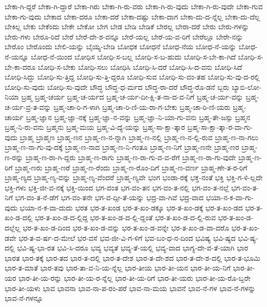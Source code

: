 {ಬೇಕಾ-ಗಿ-ದ್ದರೆ
ಬೇಕಾ-ಗಿ-ದ್ದಾರೆ
ಬೇಕಾ-ಗಿರು
ಬೇಕಾ-ಗಿ-ರು-ವರು
ಬೇಕಾ-ಗಿ-ರು-ವುದು
ಬೇಕಾ-ಗಿ-ರು-ವುದೇ
ಬೇಕಾ-ಗುವ
ಬೇಕಾ-ಗು-ವುದು
ಬೇಕಾದ
ಬೇಕಾ-ದರೂ
ಬೇಕಾ-ದರೆ
ಬೇಕಾ-ದಷ್ಟು
ಬೇಕಾ-ದಾಗ
ಬೇಕಾ-ದು-ದ-ನ್ನೆಲ್ಲ
ಬೇಕಾ-ದು-ದೆಲ್ಲ
ಬೇಕಿಲ್ಲ
ಬೇಕು
ಬೇಕೆಂದು
ಬೇಕೇ
ಬೇಕೋ
ಬೇಗ
ಬೇಡ
ಬೇಡಿ
ಬೇಡಿಕೆ
ಬೇರಲ್ಲ
ಬೇರಾ-ದರೆ
ಬೇರು
ಬೇರು-ಗಳನ್ನು
ಬೇರು-ಗಳು
ಬೇರೂ-ರಿದೆ
ಬೇರೆ
ಬೇರೆ-ದೇ-ಶ-ವನ್ನೂ
ಬೇರೆ-ಯಲ್ಲ
ಬೇರೆ-ಯ-ವ-ರಿಗೆ
ಬೇರೆಲ್ಲೂ
ಬೇರೇ-ನನ್ನು
ಬೇರೊಂ
ಬೇರೊಂದು
ಬೇಲಿ-ಯನ್ನು
ಬೈಯ್ಯ-ಬೇಡಿ
ಬೋಧಕ
ಬೋಧನೆ
ಬೋಧ-ನೆಯ
ಬೋಧ-ನೆ-ಯನ್ನು
ಬೋಧ-ನೆ-ಯನ್ನೂ
ಬೋಧ-ನೆ-ಯಿಂದ
ಬೋಧಿಸ
ಬೋಧಿ-ಸ-ಬಲ್ಲ
ಬೋಧಿ-ಸ-ಬ-ಹುದು
ಬೋಧಿ-ಸ-ಬೇ-ಕಾ-ಗಿದೆ
ಬೋಧಿ-ಸ-ಬೇ-ಕಾ-ದರೂ
ಬೋಧಿ-ಸ-ಬೇಕು
ಬೋಧಿ-ಸಲು
ಬೋಧಿಸಿ
ಬೋಧಿ-ಸಿ-ದರೆ
ಬೋಧಿ-ಸಿ-ದ-ವನು
ಬೋಧಿ-ಸಿದೆ
ಬೋಧಿ-ಸಿದ್ದು
ಬೋಧಿ-ಸು-ತ್ತಿದ್ದ
ಬೋಧಿ-ಸು-ತ್ತಿ-ದ್ದರೂ
ಬೋಧಿ-ಸುವ
ಬೋಧಿ-ಸು-ವಂ-ತಹ
ಬೋಧಿ-ಸು-ವು-ದ-ರಲ್ಲಿ
ಬೋಧಿ-ಸು-ವುದು
ಬೋಧಿ-ಸು-ವುದೇ
ಬೌದ್ಧ
ಬೌದ್ಧ-ಧ-ರ್ಮದ
ಬೌದ್ಧ-ರಾ-ದರೆ
ಬೌದ್ಧ-ರೊ-ಡನೆ
ಬ್ಬರು
ಬ್ಯಾಬಿ-ಲೋ-ನಿಯಾ
ಬ್ರಹ್ಮ
ಬ್ರಹ್ಮ-ಚರ್ಯ
ಬ್ರಹ್ಮ-ಚ-ರ್ಯದ
ಬ್ರಹ್ಮ-ಚ-ರ್ಯ-ದೀ-ಕ್ಷಿ-ತ-ನಾ-ದ-ವ-ನಿಗೆ
ಬ್ರಹ್ಮ-ಚ-ರ್ಯ-ವನ್ನು
ಬ್ರಹ್ಮ-ಚ-ರ್ಯ-ವ್ರ-ತ-ವನ್ನು
ಬ್ರಹ್ಮ-ಚಾ-ರಿ-ಗ-ಳಾಗಿ
ಬ್ರಹ್ಮ-ಚಾ-ರಿ-ಣಿ-ಯ-ರಾ-ಗ-ಬೇಕು
ಬ್ರಹ್ಮ-ಚಾ-ರಿ-ಣಿ-ಯರು
ಬ್ರಹ್ಮ-ಚಾರ್ಯ
ಬ್ರಹ್ಮ-ಜ್ಞಾನ
ಬ್ರಹ್ಮ-ಜ್ಞಾ-ನಕ್ಕೆ
ಬ್ರಹ್ಮ-ಜ್ಞಾ-ನ-ವನ್ನು
ಬ್ರಹ್ಮ-ಜ್ಞಾ-ನಿ-ಯಾ-ಗು-ವನು
ಬ್ರಹ್ಮ-ತೇ-ಜಸ್ಸು
ಬ್ರಹ್ಮನ
ಬ್ರಹ್ಮ-ನಿ-ರು-ವನು
ಬ್ರಹ್ಮನು
ಬ್ರಹ್ಮ-ಮಯ
ಬ್ರಹ್ಮ-ವಿ-ದ್ಯೆ-ಯನ್ನು
ಬ್ರಹ್ಮ-ಸಾ-ಕ್ಷಾ-ತ್ಕಾರ
ಬ್ರಹ್ಮ-ಸಾ-ಕ್ಷಾ-ತ್ಕಾ-ರ-ವಾ-ಗು-ವುದು
ಬ್ರಾಹ್ಮ
ಬ್ರಾಹ್ಮಣ
ಬ್ರಾಹ್ಮ-ಣನ
ಬ್ರಾಹ್ಮ-ಣ-ನ-ನ್ನಾಗಿ
ಬ್ರಾಹ್ಮ-ಣ-ನಲ್ಲಿ
ಬ್ರಾಹ್ಮ-ಣ-ನ-ಲ್ಲಿ-ರುವ
ಬ್ರಾಹ್ಮ-ಣ-ನಾ-ಗಲು
ಬ್ರಾಹ್ಮ-ಣ-ನಾ-ಗು-ವು-ದಕ್ಕೆ
ಬ್ರಾಹ್ಮ-ಣ-ನಾದ
ಬ್ರಾಹ್ಮ-ಣ-ನಿ-ಗಂತೂ
ಬ್ರಾಹ್ಮ-ಣ-ನಿಗೆ
ಬ್ರಾಹ್ಮ-ಣನೇ
ಬ್ರಾಹ್ಮ-ಣರ
ಬ್ರಾಹ್ಮ-ಣ-ರನ್ನು
ಬ್ರಾಹ್ಮ-ಣ-ರಾ-ಗಿ-ದ್ದರು
ಬ್ರಾಹ್ಮ-ಣ-ರಾಗು
ಬ್ರಾಹ್ಮ-ಣ-ರಾ-ಗು-ವ-ವ-ರೆಗೆ
ಬ್ರಾಹ್ಮ-ಣ-ರಾ-ಗು-ವುದೇ
ಬ್ರಾಹ್ಮ-ಣ-ರಿಗೆ
ಬ್ರಾಹ್ಮ-ಣರು
ಬ್ರಾಹ್ಮ-ಣರೆ
ಬ್ರಾಹ್ಮ-ಣ-ರೆಂದು
ಬ್ರಾಹ್ಮ-ಣ-ರೊಂ-ದಿಗೆ
ಬ್ರಾಹ್ಮ-ಣ-ವರ್ಣ
ಬ್ರಾಹ್ಮ-ಣೇ-ತ-ರ-ರಿಗೆ
ಬ್ರಾಹ್ಮ-ಣ್ಯದ
ಬ್ರಾಹ್ಮ-ಣ್ಯ-ವನ್ನು
ಬ್ರಾಹ್ಮ-ಣ್ಯ-ವೆಂದರೆ
ಬ್ರಾಹ್ಮ-ಣ್ಯವೇ
ಭಂಗ
ಭಂಡಾ-ರಕ್ಕೆ
ಭಕ್ತ-ನಂತೆ
ಭಕ್ತಿ
ಭಕ್ತಿ-ಗ-ಳಿ-ಲ್ಲದೇ
ಭಕ್ತಿ-ಗಳು
ಭಕ್ತಿ-ಜೀ-ವ-ನಕ್ಕೆ
ಭಕ್ತಿ-ಯಿಂದ
ಭಗ-ವಂತ
ಭಗ-ವಂ-ತನ
ಭಗ-ವಂ-ತ-ನಲ್ಲಿ
ಭಗ-ವಂ-ತ-ನಲ್ಲೆ
ಭಗ-ವಂ-ತ-ನಿಗೆ
ಭಗ-ವಂ-ತ-ನೆ-ಡೆಗೆ
ಭಗ-ವಂ-ತನೇ
ಭಗ-ವ-ದ್ಗೀ-ತೆ-ಯನ್ನು
ಭದ್ರ-ವಾ-ಗಿವೆ
ಭದ್ರ-ವಾದ
ಭಯಾ-ನ-ಕ-ವಾ-ಗು-ವುದು
ಭಯಾ-ನ-ಕ-ವಾ-ದುದು
ಭರತ
ಭರ-ತ-ಖಂಡ
ಭರ-ತ-ಖಂ-ಡಕ್ಕೂ
ಭರ-ತ-ಖಂ-ಡಕ್ಕೆ
ಭರ-ತ-ಖಂ-ಡದ
ಭರ-ತ-ಖಂ-ಡ-ದಲ್ಲಿ
ಭರ-ತ-ಖಂ-ಡ-ದ-ಲ್ಲಿದ್ದ
ಭರ-ತ-ಖಂ-ಡ-ದ-ಲ್ಲಿ-ದ್ದಂತೆ
ಭರ-ತ-ಖಂ-ಡ-ದ-ಲ್ಲಿ-ರುವ
ಭರ-ತ-ಖಂ-ಡ-ದಲ್ಲೆಲ್ಲ
ಭರ-ತ-ಖಂ-ಡ-ದಿಂದ
ಭರ-ತ-ಖಂ-ಡ-ವನ್ನು
ಭರ-ತ-ಖಂ-ಡ-ವನ್ನೇ
ಭರ-ತ-ಖಂ-ಡ-ವಾ-ದರೊ
ಭರ-ತ-ಖಂ-ಡವೇ
ಭರ-ತ-ವ-ರ್ಷ-ದ-ಮೇಲೆ
ಭರ-ವಸೆ
ಭವ-ಜೀ-ವಿ-ಗ-ಳಿಗೆ
ಭವ-ಬಂ-ಧ-ನ-ದಿಂದ
ಭವಿಷ್ಯ
ಭವಿ-ಷ್ಯದ
ಭವಿ-ಷ್ಯ-ದಲ್ಲಿ
ಭವಿ-ಷ್ಯ-ಭಾ-ರತ
ಭವಿ-ಸಿ-ದರೂ
ಭವ್ಯ
ಭವ್ಯತೆ
ಭವ್ಯ-ತೆ-ಯಲ್ಲಿ
ಭವ್ಯ-ವಾದ
ಭಾಗ್ಯ-ದೇ-ವ-ತೆ-ಯಾಗಿ
ಭಾರ
ಭಾರತ
ಭಾರ-ತಕ್ಕೆ
ಭಾರ-ತದ
ಭಾರ-ತ-ದಲ್ಲಿ
ಭಾರ-ತ-ದೇಶ
ಭಾರ-ತ-ದೇ-ಶದ
ಭಾರ-ತ-ದೇ-ಶ-ದಲ್ಲಿ
ಭಾರ-ತ-ಭೂಮಿ
ಭಾರ-ತ-ಮಾತೆ
ಭಾರ-ತವು
ಭಾರ-ತಾ-ವ-ನಿ-ಯ-ನ್ನೆಲ್ಲ
ಭಾರ-ತೀಯ
ಭಾರ-ತೀ-ಯನ
ಭಾರ-ತೀ-ಯ-ನಿಗೆ
ಭಾರ-ತೀ-ಯರ
ಭಾರ-ತೀ-ಯ-ರನ್ನು
ಭಾರ-ತೀ-ಯ-ರ-ನ್ನೆಲ್ಲ
ಭಾರ-ತೀ-ಯ-ರಿಗೆ
ಭಾರ-ತೀ-ಯರು
ಭಾರ-ತೀ-ಯ-ರೊ-ಬ್ಬರೇ
ಭಾರ-ತೀ-ಯಳು
ಭಾವ
ಭಾವನಾ
ಭಾವ-ನಾ-ಪ-ರಂ-ಪರೆ
ಭಾವ-ನಾ-ಮಯ
ಭಾವನೆ
ಭಾವ-ನೆ-ಗಳ
ಭಾವ-ನೆ-ಗಳನ್ನು
ಭಾವ-ನೆ-ಗಳನ್ನೂ
}
